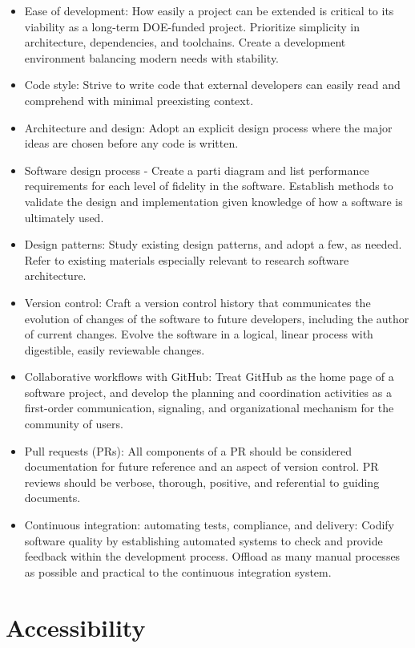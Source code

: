 \documentclass[]{nlr}
\begin{document}
\begin{itemize}
\item Ease of development: How easily a project can be extended is critical to its viability as a long-term
DOE-funded project.
Prioritize simplicity in architecture, dependencies, and toolchains.
Create a development environment balancing modern needs with stability.
\item Code style: Strive to write code that external developers can easily read and comprehend with minimal
preexisting context.
\item Architecture and design: Adopt an explicit design process where the major ideas are chosen before any code is written.
\item Software design process - Create a parti diagram and list performance requirements for each level of fidelity in the software.
Establish methods to validate the design and implementation given knowledge of how a software
is ultimately used.
\item Design patterns: Study existing design patterns, and adopt a few, as needed.
Refer to existing materials especially relevant to research software architecture.
\item Version control: Craft a version control history that communicates the evolution of changes of the software
to future developers, including the author of current changes.
Evolve the software in a logical, linear process with digestible, easily reviewable changes.
\item Collaborative workflows with GitHub: Treat GitHub as the home page of a software project, and develop the planning and coordination
activities as a first-order communication, signaling, and organizational mechanism for the
community of users.
\item Pull requests (PRs): All components of a PR should be considered documentation for future reference
and an aspect of version control.
PR reviews should be verbose, thorough, positive, and referential to guiding documents.
\item Continuous integration: automating tests, compliance, and delivery: Codify software quality by establishing automated systems to check and provide feedback
within the development process.
Offload as many manual processes as possible and practical to the continuous integration system.
\end{itemize}


\chapter{Accessibility}
\label{sec:accessibility}
\end{document}
